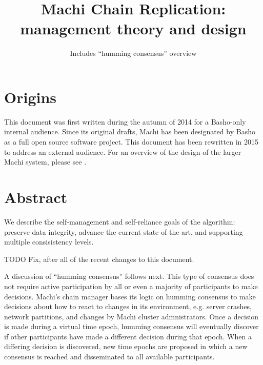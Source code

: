 \documentclass[preprint,10pt]{sigplanconf}
\begin{document}

\conferenceinfo{}{} 


\title{Machi Chain Replication: management theory and design}
\subtitle{Includes ``humming consensus'' overview}


\maketitle

\section{Origins}
\label{sec:origins}

This document was first written during the autumn of 2014 for a
Basho-only internal audience.  Since its original drafts, Machi has
been designated by Basho as a full open source software project.  This
document has been rewritten in 2015 to address an external audience.
For an overview of the design of the larger Machi system, please see
\cite{machi-design}.

\section{Abstract}
\label{sec:abstract}

We describe the self-management and self-reliance
goals of the algorithm: preserve data integrity, advance the current
state of the art, and supporting multiple consisistency levels.

TODO Fix, after all of the recent changes to this document.

A discussion of ``humming consensus'' follows next.  This type of
consensus does not require active participation by all or even a
majority of participants to make decisions.  Machi's chain manager
bases its logic on humming consensus to make decisions about how to
react to changes in its environment, e.g. server crashes, network
partitions, and changes by Machi cluster admnistrators.  Once a
decision is made during a virtual time epoch, humming consensus will
eventually discover if other participants have made a different
decision during that epoch.  When a differing decision is discovered,
new time epochs are proposed in which a new consensus is reached and
disseminated to all available participants.
\end{document}
